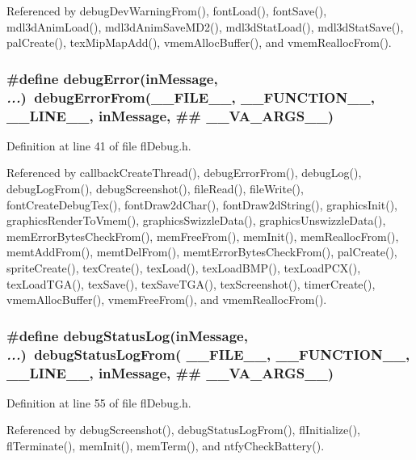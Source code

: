 Referenced by debug\-Dev\-Warning\-From(), font\-Load(), font\-Save(), mdl3d\-Anim\-Load(), mdl3d\-Anim\-Save\-MD2(), mdl3d\-Stat\-Load(), mdl3d\-Stat\-Save(), pal\-Create(), tex\-Mip\-Map\-Add(), vmem\-Alloc\-Buffer(), and vmem\-Realloc\-From().
\subsubsection{\setlength{\rightskip}{0pt plus 5cm}\#define debug\-Error(in\-Message,  {\em ...})~debug\-Error\-From(\_\-\_\-FILE\_\-\_\-, \_\-\_\-FUNCTION\_\-\_\-, \_\-\_\-LINE\_\-\_\-, in\-Message, \#\# \_\-\_\-VA\_\-ARGS\_\-\_\-)}\label{flDebug_8h_2cd68b8e989a5902ba62dabe20596f07}




Definition at line 41 of file fl\-Debug.h.

Referenced by callback\-Create\-Thread(), debug\-Error\-From(), debug\-Log(), debug\-Log\-From(), debug\-Screenshot(), file\-Read(), file\-Write(), font\-Create\-Debug\-Tex(), font\-Draw2d\-Char(), font\-Draw2d\-String(), graphics\-Init(), graphics\-Render\-To\-Vmem(), graphics\-Swizzle\-Data(), graphics\-Unswizzle\-Data(), mem\-Error\-Bytes\-Check\-From(), mem\-Free\-From(), mem\-Init(), mem\-Realloc\-From(), memt\-Add\-From(), memt\-Del\-From(), memt\-Error\-Bytes\-Check\-From(), pal\-Create(), sprite\-Create(), tex\-Create(), tex\-Load(), tex\-Load\-BMP(), tex\-Load\-PCX(), tex\-Load\-TGA(), tex\-Save(), tex\-Save\-TGA(), tex\-Screenshot(), timer\-Create(), vmem\-Alloc\-Buffer(), vmem\-Free\-From(), and vmem\-Realloc\-From().
\subsubsection{\setlength{\rightskip}{0pt plus 5cm}\#define debug\-Status\-Log(in\-Message,  {\em ...})~debug\-Status\-Log\-From( \_\-\_\-FILE\_\-\_\-, \_\-\_\-FUNCTION\_\-\_\-, \_\-\_\-LINE\_\-\_\-, in\-Message, \#\# \_\-\_\-VA\_\-ARGS\_\-\_\-)}\label{flDebug_8h_cc3801a5f77287b2c168ec14ab70927d}




Definition at line 55 of file fl\-Debug.h.

Referenced by debug\-Screenshot(), debug\-Status\-Log\-From(), fl\-Initialize(), fl\-Terminate(), mem\-Init(), mem\-Term(), and ntfy\-Check\-Battery().
